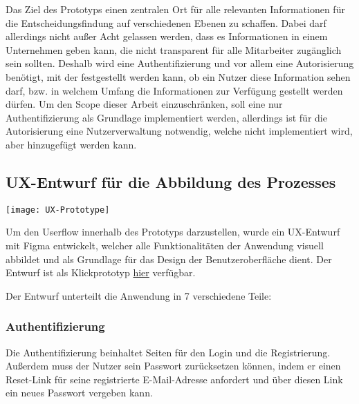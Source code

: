 Das Ziel des Prototyps einen zentralen Ort für alle relevanten Informationen für die Entscheidungsfindung auf verschiedenen Ebenen zu schaffen. Dabei darf allerdings nicht außer Acht gelassen werden, dass es Informationen in einem Unternehmen geben kann, die nicht transparent für alle Mitarbeiter zugänglich sein sollten. Deshalb wird eine Authentifizierung und vor allem eine Autorisierung benötigt, mit der festgestellt werden kann, ob ein Nutzer diese Information sehen darf, bzw. in welchem Umfang die Informationen zur Verfügung gestellt werden dürfen. Um den Scope dieser Arbeit einzuschränken, soll eine nur Authentifizierung als Grundlage implementiert werden, allerdings ist für die Autorisierung eine Nutzerverwaltung notwendig, welche nicht implementiert wird, aber hinzugefügt werden kann.

\subsection{UX-Entwurf für die Abbildung des Prozesses}
\vspace{20pt}
\begin{center}
    \begin{minipage}{\linewidth}
        \texttt{[image: UX-Prototype]}
    \end{minipage}
\end{center}
\vspace{20pt}

Um den Userflow innerhalb des Prototyps darzustellen, wurde ein UX-Entwurf mit Figma entwickelt, welcher alle Funktionalitäten der Anwendung visuell abbildet und als Grundlage für das Design der Benutzeroberfläche dient. Der Entwurf ist als Klickprototyp \href{https://www.figma.com/proto/6TjaUCKvs4DjwzTDEiWxiO/Prototype?type=design&node-id=0-1&scaling=min-zoom&starting-point-node-id=2%3A61}{hier} verfügbar.

Der Entwurf unterteilt die Anwendung in 7 verschiedene Teile:

\subsubsection{Authentifizierung}
Die Authentifizierung beinhaltet Seiten für den Login und die Registrierung. Außerdem muss der Nutzer sein Passwort zurücksetzen können, indem er einen Reset-Link für seine registrierte E-Mail-Adresse anfordert und über diesen Link ein neues Passwort vergeben kann.

